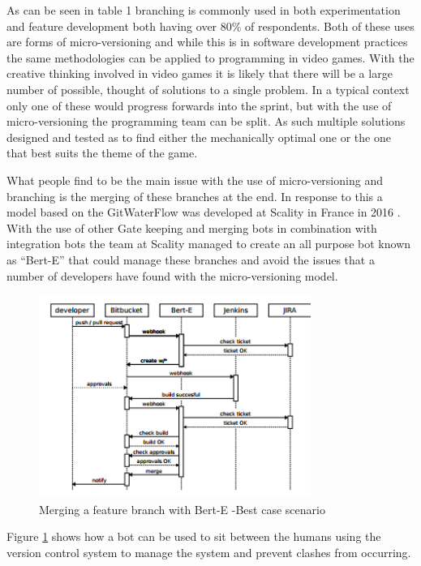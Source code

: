 \documentclass{scrartcl}
\begin{document}
As can be seen in table 1 branching is commonly used in both experimentation and feature development both having over 80\% of respondents. Both of these uses are forms of micro-versioning and while this is in software development practices the same methodologies can be applied to programming in video games. With the creative thinking involved in video games it is likely that there will be a large number of possible, thought of solutions to a single problem. In a typical context only one of these would progress forwards into the sprint, but with the use of micro-versioning the programming team can be split. As such multiple solutions designed and tested as to find either the mechanically optimal one or the one that best suits the theme of the game. 

What people find to be the main issue with the use of micro-versioning and branching is the merging of these branches at the end. In response to this a model based on the GitWaterFlow was developed at Scality in France in 2016 \cite{GitWaterFlow}. With the use of other Gate keeping and merging bots in combination with integration bots the team at Scality managed to create an all purpose bot known as ``Bert-E'' that could manage these branches and avoid the issues that a number of developers have found with the micro-versioning model.
\begin{figure}[h!]
	\begin{center}
	\includegraphics [width=0.79\textwidth,inner]{BertE}
	\caption{Merging a feature branch with Bert-E -Best case scenario \cite{GitWaterFlow}}
	\label{BertE}
	\end{center}
\end{figure}

Figure \ref{BertE}  shows how a bot can be used to sit between the humans using the version control system to manage the system and prevent clashes from occurring.
\end{document}
